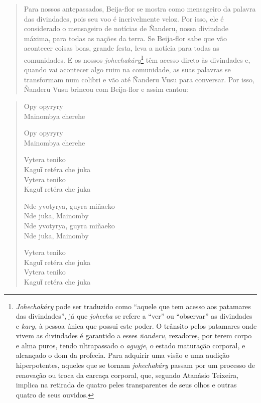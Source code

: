 \begin{itemize}
\begin{quote}
Para nossos antepassados, Beija-flor se mostra como mensageiro da
palavra das divindades, pois seu voo é incrivelmente veloz. Por isso,
ele é considerado o mensageiro de notícias de Ñanderu, nossa divindade
máxima, para todas as nações da terra. Se Beija-flor sabe que vão
acontecer coisas boas, grande festa, leva a notícia para todas as
comunidades. E os nossos \emph{johechakáry}\footnote{\emph{Johechakáry}
  pode ser traduzido como ``aquele que tem acesso aos patamares das
  divindades'', já que \emph{johecha} se refere a ``ver'' ou
  ``observar'' as divindades e \emph{kary,} à pessoa única que possui
  este poder. O trânsito pelos patamares onde vivem as divindades é
  garantido a esses \emph{ñanderu}, rezadores, por terem corpo e alma
  puros, tendo ultrapassado o \emph{aguyje}, o estado maturação
  corporal, e alcançado o dom da profecia. Para adquirir uma visão e uma
  audição hiperpotentes, aqueles que se tornam \emph{johechakáry} passam
  por um processo de renovação ou troca da carcaça corporal, que,
  segundo Atanásio Teixeira, implica na retirada de quatro peles
  transparentes de seus olhos e outras quatro de seus ouvidos.} têm
acesso direto às divindades e, quando vai acontecer algo ruim na
comunidade, as suas palavras se transformam num colibri e vão até
Ñanderu Vusu para conversar. Por isso, Ñanderu Vusu brincou com
Beija-flor e assim cantou:
\end{quote}

\begin{verse}
Opy opyryry\\
Mainombya cherehe

Opy opyryry\\
Mainombya cherehe

Vytera teniko\\
Kaguῖ retéra che juka\footnotemark{}\\
Vytera teniko\\
Kaguῖ retéra che juka

Nde yvotyrya, guyra miñaeko\\
Nde juka, Mainomby\\
Nde yvotyrya, guyra miñaeko\\
Nde juka, Mainomby

Vytera teniko\\
Kaguῖ retéra che juka\\
Vytera teniko\\
Kaguῖ retéra che juka
\end{verse}


\end{itemize}
